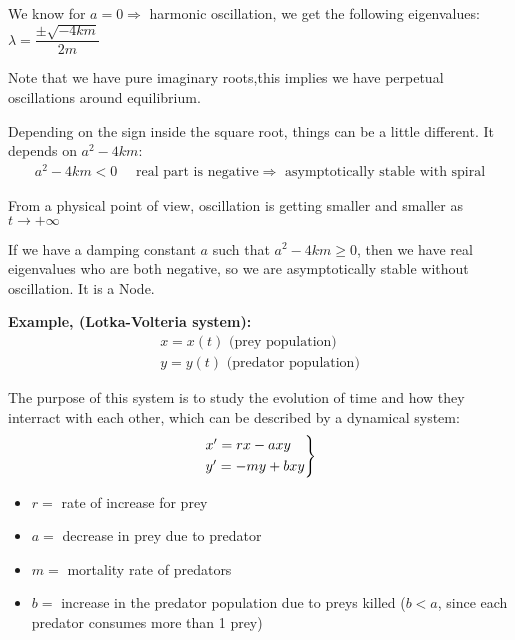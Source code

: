 \par\bigskip
\noindent We know for $a = 0\Rightarrow$ harmonic oscillation, we get the following eigenvalues: $\lambda=\dfrac{\pm\sqrt{-4km}}{2m}$\par
\noindent Note that we have pure imaginary roots,this implies we have perpetual oscillations around equilibrium.
\par\bigskip
\noindent Depending on the sign inside the square root, things can be a little different. It depends on $a^2-4km$:
\begin{equation*}
  \begin{gathered}
    a^2-4km<0\quad\text{ real part is negative}\Rightarrow\text{ asymptotically stable with spiral} 
  \end{gathered}
\end{equation*}
\par\bigskip
\noindent From a physical point of view, oscillation is getting smaller and smaller as $t\to+\infty$ \par
\noindent If we have a damping constant $a$ such that $a^2-4km\geq0$, then we have real eigenvalues who are both negative, so we are asymptotically stable without oscillation. It is a Node.
\par\bigskip
\noindent\textbf{Example, (Lotka-Volteria system):} 
\begin{equation*}
  \begin{gathered}
    x = x(t)\text{ (prey population)}\\
    y=y(t)\text{ (predator population)}
  \end{gathered}
\end{equation*}
\par\bigskip
\noindent The purpose of this system is to study the evolution of time and how they interract with each other, which can be described by a dynamical system:
\begin{equation*}
  \begin{gathered}
    \begin{rcases*}
      x^{\prime} = rx-axy\\
      y^{\prime} = -my+bxy
    \end{rcases*}
  \end{gathered}
\end{equation*}\par
\begin{itemize}
  \item $r = $ rate of increase for prey 
  \item $a = $ decrease in prey due to predator
  \item $m = $ mortality rate of predators
  \item $b = $ increase in the predator population due to preys killed ($b<a$, since each predator consumes more than 1 prey)
\end{itemize}
